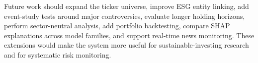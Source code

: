 \documentclass[sigconf,nonacm]{acmart}
\newif\ifusingacmart
\newif\ifusingacmart
\begin{document}
Future work should expand the ticker universe, improve ESG entity linking, add event-study tests around major controversies, evaluate longer holding horizons, perform sector-neutral analysis, add portfolio backtesting, compare SHAP explanations across model families, and support real-time news monitoring. These extensions would make the system more useful for sustainable-investing research and for systematic risk monitoring.

\ifusingacmart
  
\else
  
\fi

\end{document}
